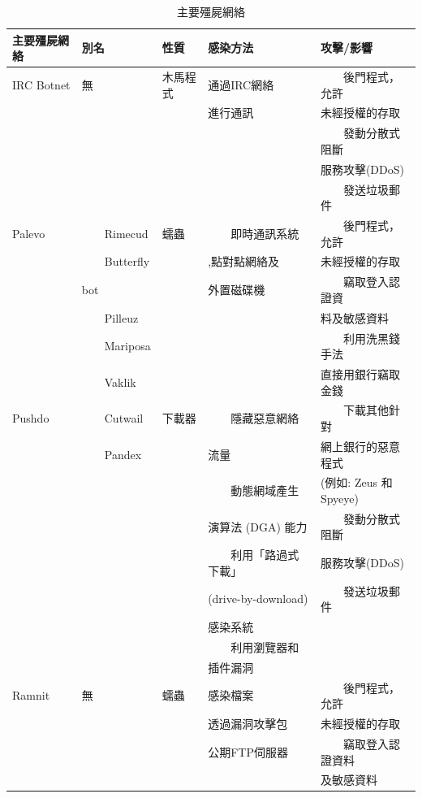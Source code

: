 \documentclass[14pt]{extarticle}
\newcommand{\tabitem}{~~\llap{\textbullet}~~}
\begin{document}
\begin{table}[!htbp]
\centering
\caption{主要殭屍網絡}
\begin{tabular}{lllll} \hline
\bf 主要殭屍網絡 & \bf 別名 & \bf 性質 & \bf 感染方法 & \bf 攻擊/影響\\\hline
IRC Botnet & 無 & 木馬程式 &  通過IRC網絡 & \tabitem	後門程式，允許 \\
 &&& 進行通訊 & 未經授權的存取 \\
 &&&& \tabitem 發動分散式阻斷 \\
 &&&& 服務攻擊(DDoS) \\
 &&&& \tabitem 發送垃圾郵件 \\\hline
Palevo & \tabitem Rimecud & 蠕蟲 & \tabitem 即時通訊系統  & \tabitem 後門程式，允許 \\
& \tabitem Butterfly & & ,點對點網絡及 & 未經授權的存取 \\
& bot & & 外置磁碟機 & \tabitem 竊取登入認證資 \\
& \tabitem Pilleuz &&& 料及敏感資料 \\
& \tabitem Mariposa &&& \tabitem 利用洗黑錢手法 \\
& \tabitem Vaklik &&& 直接用銀行竊取金錢 \\\hline
Pushdo & \tabitem Cutwail & 下載器 & \tabitem 隱藏惡意網絡 & \tabitem 下載其他針對\\
& \tabitem Pandex & & 流量 &  網上銀行的惡意程式 \\
& & & \tabitem 動態網域產生 & (例如: Zeus 和Spyeye) \\
& & & 演算法 (DGA) 能力 & \tabitem 發動分散式阻斷 \\
& & & \tabitem 利用「路過式下載」 & 服務攻擊(DDoS) \\
& & & (drive-by-download) & \tabitem 發送垃圾郵件 \\
& & & 感染系統 \\
& & & \tabitem 利用瀏覽器和 \\
& & & 插件漏洞 \\\hline
Ramnit & 無	& 蠕蟲 &	感染檔案 & \tabitem 後門程式，允許 \\
& & & 透過漏洞攻擊包 & 未經授權的存取 \\
& & & 公期FTP伺服器 & \tabitem 竊取登入認證資料 \\
&&&&及敏感資料 \\\hline




\end{tabular}
\end{table}
\end{document}
